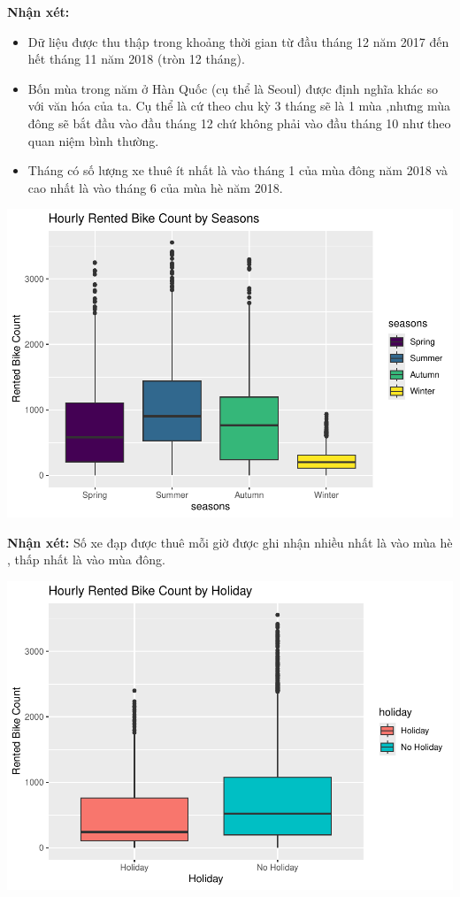 \documentclass[
  11pt,
  letterpaper,
]{article}
\begin{document}
\textbf{Nhận xét:}

\begin{itemize}
\item Dữ liệu được thu thập  trong khoảng thời gian từ đầu tháng 12 năm 2017 đến hết tháng 11 năm 2018 (tròn 12 tháng).
\item Bốn mùa trong năm ở Hàn Quốc (cụ thể là Seoul) được định nghĩa khác so với văn hóa của ta. Cụ thể là cứ theo chu kỳ 3 tháng sẽ là 1 mùa ,nhưng mùa đông sẽ bắt đầu vào đầu tháng 12 chứ không phải vào đầu tháng 10 như theo quan niệm bình thường.
\item Tháng có số lượng xe thuê ít nhất là vào tháng 1 của mùa đông năm 2018 và cao nhất là vào tháng 6 của mùa hè năm 2018.
\end{itemize}

\begin{center}\includegraphics[width=1.2\linewidth,]{Final_Project_files/figure-latex/unnamed-chunk-3-1} \end{center}

\textbf{Nhận xét:} Số xe đạp được thuê mỗi giờ được ghi nhận nhiều nhất là vào mùa hè , thấp nhất là vào mùa đông.

\begin{center}\includegraphics[width=1.2\linewidth,]{Final_Project_files/figure-latex/unnamed-chunk-4-1} \end{center}
\end{document}
